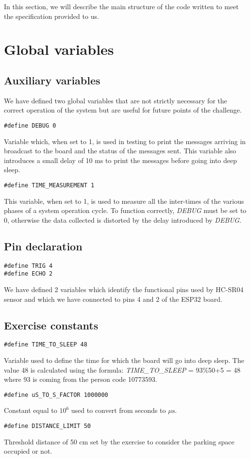In this section, we will describe the main structure of the code written to meet the specification provided to us.
\section{Global variables}
\subsection{Auxiliary variables}
We have defined two global variables that are not strictly necessary for the correct operation of the system but are useful for future points of the challenge.
\begin{verbatim}
#define DEBUG 0
\end{verbatim}
Variable which, when set to 1, is used in testing to print the messages arriving in broadcast to the board and the status of the messages sent. This variable also introduces a small delay of 10 ms to print the messages before going into deep sleep.\\
\begin{verbatim}
#define TIME_MEASUREMENT 1
\end{verbatim}
This variable, when set to 1, is used to measure all the inter-times of the various phases of a system operation cycle. To function correctly, \textit{DEBUG} must be set to 0, otherwise the data collected is distorted by the delay introduced by \textit{DEBUG}.


\subsection{Pin declaration}
\begin{verbatim}
#define TRIG 4
#define ECHO 2
\end{verbatim}
We have defined 2 variables which identify the functional pins used by HC-SR04 sensor and which we have connected to pins 4 and 2 of the ESP32 board.

\subsection{Exercise constants}
\begin{verbatim}
#define TIME_TO_SLEEP 48
\end{verbatim}
Variable used to define the time for which the board will go into deep sleep. The value 48 is calculated using the formula: \textit{TIME\_TO\_SLEEP} = 93\%50+5 = 48 \\
where 93 is coming from the person code 10773593. \\
\begin{verbatim}
#define uS_TO_S_FACTOR 1000000
\end{verbatim}
Constant equal to $10^6$ used to convert from seconds to $\mu\text{s}$.\\
\begin{verbatim}
#define DISTANCE_LIMIT 50
\end{verbatim}
Threshold distance of 50 cm set by the exercise to consider the parking space occupied or not.


